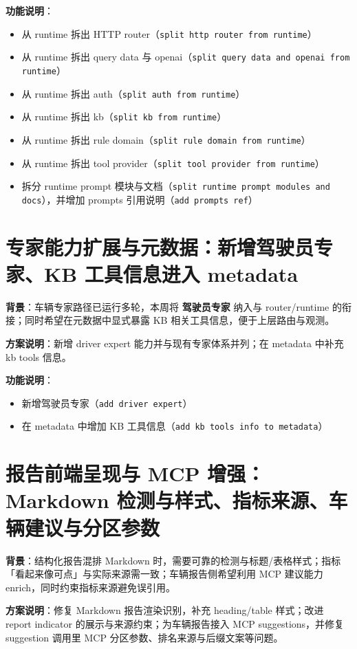 \documentclass[UTF8]{ctexart}
\begin{document}
\textbf{功能说明}：
\begin{itemize}
\item 从 runtime 拆出 HTTP router（\texttt{split http router from runtime}）
\item 从 runtime 拆出 query data 与 openai（\texttt{split query data and openai from runtime}）
\item 从 runtime 拆出 auth（\texttt{split auth from runtime}）
\item 从 runtime 拆出 kb（\texttt{split kb from runtime}）
\item 从 runtime 拆出 rule domain（\texttt{split rule domain from runtime}）
\item 从 runtime 拆出 tool provider（\texttt{split tool provider from runtime}）
\item 拆分 runtime prompt 模块与文档（\texttt{split runtime prompt modules and docs}），并增加 prompts 引用说明（\texttt{add prompts ref}）
\end{itemize}

\section{专家能力扩展与元数据：新增驾驶员专家、KB 工具信息进入 metadata}

\textbf{背景}：车辆专家路径已运行多轮，本周将 \textbf{驾驶员专家} 纳入与 router/runtime 的衔接；同时希望在元数据中显式暴露 KB 相关工具信息，便于上层路由与观测。

\textbf{方案说明}：新增 driver expert 能力并与现有专家体系并列；在 metadata 中补充 kb tools 信息。

\textbf{功能说明}：
\begin{itemize}
\item 新增驾驶员专家（\texttt{add driver expert}）
\item 在 metadata 中增加 KB 工具信息（\texttt{add kb tools info to metadata}）
\end{itemize}

\section{报告前端呈现与 MCP 增强：Markdown 检测与样式、指标来源、车辆建议与分区参数}

\textbf{背景}：结构化报告混排 Markdown 时，需要可靠的检测与标题/表格样式；指标「看起来像可点」与实际来源需一致；车辆报告侧希望利用 MCP 建议能力 enrich，同时约束指标来源避免误引用。

\textbf{方案说明}：修复 Markdown 报告渲染识别，补充 heading/table 样式；改进 report indicator 的展示与来源约束；为车辆报告接入 MCP suggestions，并修复 suggestion 调用里 MCP 分区参数、排名来源与后缀文案等问题。
\end{document}
